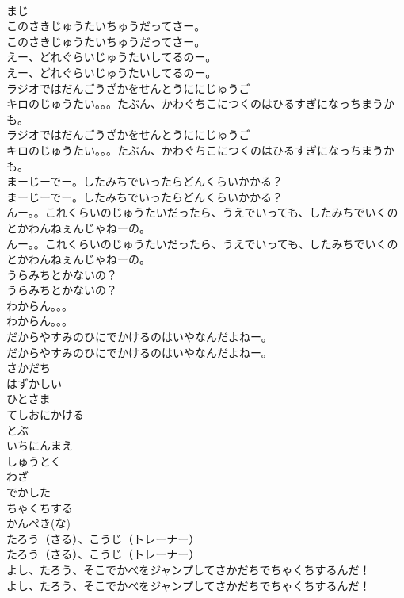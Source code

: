 \documentclass[8pt]{extreport}
\begin{document}
\begin{CJK}{UTF8}{min}
\\	まじ
\\	このさきじゅうたいちゅうだってさー。	
\\	このさきじゅうたいちゅうだってさー。 
\\	えー、どれぐらいじゅうたいしてるのー。	
\\	えー、どれぐらいじゅうたいしてるのー。 
\\	ラジオではだんごうざかをせんとうににじゅうご
\\	キロのじゅうたい。。。たぶん、かわぐちこにつくのはひるすぎになっちまうかも。	
\\	ラジオではだんごうざかをせんとうににじゅうご
\\	キロのじゅうたい。。。たぶん、かわぐちこにつくのはひるすぎになっちまうかも。 
\\	まーじーでー。したみちでいったらどんくらいかかる？	
\\	まーじーでー。したみちでいったらどんくらいかかる？ 
\\	んー。。これくらいのじゅうたいだったら、うえでいっても、したみちでいくのとかわんねぇんじゃねーの。	
\\	んー。。これくらいのじゅうたいだったら、うえでいっても、したみちでいくのとかわんねぇんじゃねーの。 
\\	うらみちとかないの？	
\\	うらみちとかないの？ 
\\	わからん。。。	
\\	わからん。。。 
\\	だからやすみのひにでかけるのはいやなんだよねー。	
\\	だからやすみのひにでかけるのはいやなんだよねー。 
\\	さかだち
\\	はずかしい
\\	ひとさま
\\	てしおにかける
\\	とぶ
\\	いちにんまえ
\\	しゅうとく
\\	わざ
\\	でかした
\\	ちゃくちする
\\	かんぺき(な)
\\	たろう（さる）、こうじ（トレーナー）	
\\	たろう（さる）、こうじ（トレーナー） 
\\	よし、たろう、そこでかべをジャンプしてさかだちでちゃくちするんだ！	
\\	よし、たろう、そこでかべをジャンプしてさかだちでちゃくちするんだ！ 

\end{CJK}
\end{document}
